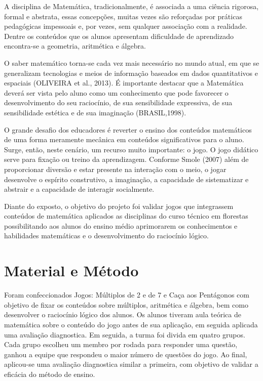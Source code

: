 \documentclass[article,12pt,onesidea,4paper,english,brazil]{abntex2}
\begin{document}
	A disciplina de Matemática, tradicionalmente, é associada a uma ciência rigorosa, formal e abstrata, essas concepções, muitas vezes são reforçadas por práticas pedagógicas impessoais e, por vezes, sem qualquer associação com a realidade. Dentre os conteúdos que os alunos apresentam dificuldade de aprendizado encontra-se a geometria, aritmética e álgebra.
	
	O saber matemático torna-se cada vez mais necessário no mundo atual, em que se generalizam tecnologias e meios de informação baseados em dados quantitativos e espaciais (OLIVEIRA et al., 2013). É importante destacar que a Matemática deverá ser vista pelo aluno como um conhecimento que pode favorecer o desenvolvimento do seu raciocínio, de sua sensibilidade expressiva, de sua sensibilidade estética e de sua imaginação (BRASIL,1998).
	
	O grande desafio dos educadores é reverter o ensino dos conteúdos matemáticos de uma forma meramente mecânica em conteúdos significativos para o aluno. Surge, então, neste cenário, um recurso muito importante: o jogo. O jogo didático serve para fixação ou treino da aprendizagem. Conforme Smole (2007) além de proporcionar diversão e estar presente na interação com o meio, o jogar desenvolve o espírito construtivo, a imaginação, a capacidade de sistematizar e abstrair e a capacidade de interagir socialmente.
	
	Diante do exposto, o objetivo do projeto foi validar jogos que integrassem conteúdos de matemática aplicados as disciplinas do curso técnico em florestas possibilitando aos alunos do ensino médio aprimorarem os conhecimentos e habilidades matemáticas e o desenvolvimento do raciocínio lógico.
	
	\section*{Material e Método}
	
Foram confeccionados Jogos: Múltiplos de 2 e de 7 e Caça aos Pentágonos com objetivo de fixar os conteúdos sobre múltiplos, aritmética e álgebra, bem como desenvolver o raciocínio lógico dos alunos. Os alunos tiveram aula teórica de matemática sobre o conteúdo do jogo antes de sua aplicação, em seguida aplicada uma avaliação diagnostica. Em seguida, a turma foi divida em quatro grupos. Cada grupo escolheu um membro por rodada para responder uma questão, ganhou a equipe que respondeu o maior número de questões do jogo. Ao final, aplicou-se uma avaliação diagnostica similar a primeira, com objetivo de validar a eficácia do método de ensino.
\end{document}
